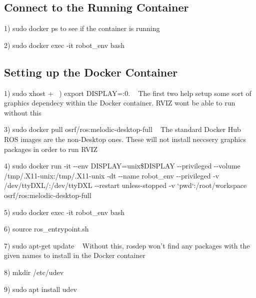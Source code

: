 \subsection*{Connect to the Running Container}

1) {\ttfamily sudo docker ps} to see if the container is running

2) {\ttfamily sudo docker exec -\/it robot\+\_\+env bash} ~\newline


\subsection*{Setting up the Docker Container}

1) {\ttfamily sudo xhost +} ~) {\ttfamily export D\+I\+S\+P\+L\+AY=\+:0.} ~\newline
 The first two help setup some sort of graphics dependecy within the Docker container. R\+V\+IZ won\textquotesingle{}t be able to run without this

3) {\ttfamily sudo docker pull osrf/ros\+:melodic-\/desktop-\/full} ~\newline
 The standard Docker Hub R\+OS images are the non-\/\+Desktop ones. These will not install neccsery graphics packages in order to run R\+V\+IZ

4) {\ttfamily sudo docker run -\/it -\/-\/env D\+I\+S\+P\+L\+AY=unix\$\+D\+I\+S\+P\+L\+AY -\/-\/privileged -\/-\/volume /tmp/.X11-\/unix\+:/tmp/.X11-\/unix -\/dt -\/-\/name robot\+\_\+env -\/-\/privileged -\/v /dev/tty\+D\+X\+L/\+:/dev/tty\+D\+XL -\/-\/restart unless-\/stopped -\/v `pwd`\+:/root/workspace osrf/ros\+:melodic-\/desktop-\/full} ~\newline


5) {\ttfamily sudo docker exec -\/it robot\+\_\+env bash} ~\newline


6) {\ttfamily source ros\+\_\+entrypoint.\+sh} ~\newline


7) {\ttfamily sudo apt-\/get update} ~\newline
 Without this, rosdep won’t find any packages with the given names to install in the Docker container

8) {\ttfamily mkdir /etc/udev} ~\newline


9) {\ttfamily sudo apt install udev} ~\newline


